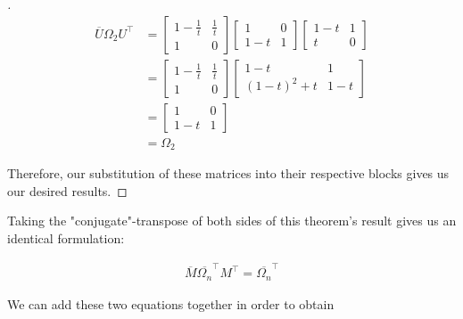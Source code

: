 \documentclass[10pt]{ucthesis}
\begin{document}
\begin{proof}[\cite{Kassel}]
\begin{equation}
	\begin{aligned}
		\overline{U}\Omega_2U^\intercal &= \begin{bmatrix}
													1-\frac{1}{t} & \frac{1}{t}\\
													1 & 0 
													\end{bmatrix}
													\begin{bmatrix}
													1 & 0\\
													1-t & 1 
													\end{bmatrix}
													\begin{bmatrix}
													1-t & 1\\
													t & 0 
													\end{bmatrix}\\
												&= \begin{bmatrix}
													1-\frac{1}{t} & \frac{1}{t}\\
													1 & 0 
													\end{bmatrix}
													\begin{bmatrix}
													1-t & 1\\
													(1-t)^2 + t & 1-t 
													\end{bmatrix}\\
												&= \begin{bmatrix}
													1 & 0\\
													1-t & 1 
													\end{bmatrix} \\
												&= \Omega_2
	\end{aligned}
\end{equation}

Therefore, our substitution of these matrices into their respective blocks gives us our desired results. \end{proof} 

Taking the "conjugate"-transpose of both sides of this theorem's result gives us an identical formulation:

\begin{equation}
	\begin{aligned}
		\overline{M} \overline{\Omega_n}^\intercal M^\intercal = \overline{\Omega_n}^\intercal
	\end{aligned}
\end{equation}

We can add these two equations together in order to obtain
\end{document}
